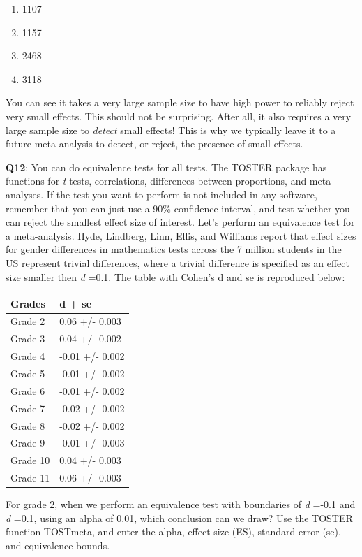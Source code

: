 \documentclass[
  oneside]{krantz}
\providecommand{\tightlist}{%
  \setlength{\itemsep}{0pt}\setlength{\parskip}{0pt}}
\begin{document}
\begin{enumerate}
\def\labelenumi{\Alph{enumi})}
\tightlist
\item
  1107
\item
  1157
\item
  2468
\item
  3118
\end{enumerate}

You can see it takes a very large sample size to have high power to reliably reject very small effects. This should not be surprising. After all, it also requires a very large sample size to \emph{detect} small effects! This is why we typically leave it to a future meta-analysis to detect, or reject, the presence of small effects.

\textbf{Q12}: You can do equivalence tests for all tests. The TOSTER package has functions for \emph{t}-tests, correlations, differences between proportions, and meta-analyses. If the test you want to perform is not included in any software, remember that you can just use a 90\% confidence interval, and test whether you can reject the smallest effect size of interest. Let's perform an equivalence test for a meta-analysis. Hyde, Lindberg, Linn, Ellis, and Williams \citeyearpar{hyde_gender_2008} report that effect sizes for gender differences
in mathematics tests across the 7 million students in the US represent trivial differences, where a trivial difference is specified as an effect size smaller then \emph{d} =0.1. The table with Cohen's d and se is reproduced below:

\begin{longtable}[]{@{}ll@{}}
\toprule()
\textbf{Grades} & \textbf{d + se} \\
\midrule()
\endhead
Grade 2 & 0.06 +/- 0.003 \\
Grade 3 & 0.04 +/- 0.002 \\
Grade 4 & -0.01 +/- 0.002 \\
Grade 5 & -0.01 +/- 0.002 \\
Grade 6 & -0.01 +/- 0.002 \\
Grade 7 & -0.02 +/- 0.002 \\
Grade 8 & -0.02 +/- 0.002 \\
Grade 9 & -0.01 +/- 0.003 \\
Grade 10 & 0.04 +/- 0.003 \\
Grade 11 & 0.06 +/- 0.003 \\
\bottomrule()
\end{longtable}

For grade 2, when we perform an equivalence test with boundaries of \emph{d} =-0.1 and \emph{d} =0.1, using an alpha of 0.01, which conclusion can we draw? Use the TOSTER function TOSTmeta, and enter the alpha, effect size (ES), standard error (se), and equivalence bounds.
\end{document}
